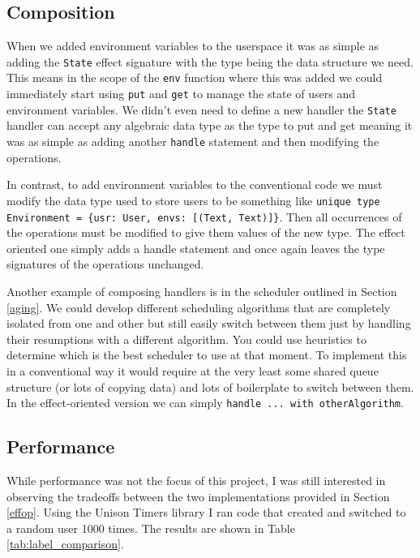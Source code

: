\documentclass[logo,bsc,singlespacing,parskip]{infthesis}
\begin{document}
\subsection{Composition}

When we added environment variables to the userspace it was as simple as adding
the \texttt{State} effect signature with the type being the data structure we
need. This means in the scope of the \texttt{env} function where this was added
we could immediately start using \texttt{put} and \texttt{get} to manage the
state of users and environment variables. We didn't even need to define a new
handler the \texttt{State} handler can accept any algebraic data type as the
type to put and get meaning it was as simple as adding another \texttt{handle}
statement and then modifying the operations.

In contrast, to add environment variables to the conventional code we must
modify the data type used to store users to be something like \texttt{unique
type Environment = \{usr: User, envs: [(Text, Text)]\}}. Then all occurrences of
the operations must be modified to give them values of the new type. The effect
oriented one simply adds a handle statement and once again leaves the type
signatures of the operations unchanged.

Another example of composing handlers is in the scheduler outlined in Section
\ref{aging}. We could develop different scheduling algorithms that are
completely isolated from one and other but still easily switch between them
just by handling their resumptions with a different algorithm. You could use
heuristics to determine which is the best scheduler to use at that moment. To
implement this in a conventional way it would require at the very least some
shared queue structure (or lots of copying data) and lots of boilerplate to
switch between them. In the effect-oriented version we can simply
\texttt{handle ... with otherAlgorithm}.

\subsection{Performance}

While performance was not the focus of this project, I was still interested in
observing the tradeoffs between the two implementations provided in Section
\ref{effop}. Using the Unison Timers library \cite{timers} I ran code that
created and switched to a random user 1000 times. The results are shown in
Table \ref{tab:label_comparison}. 
\end{document}
